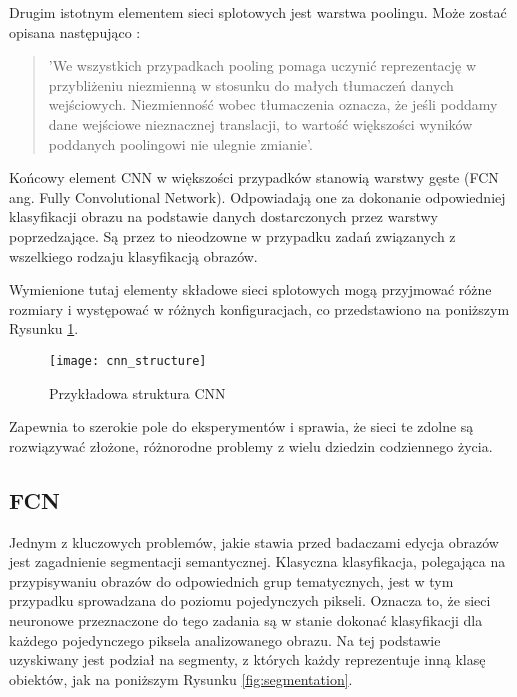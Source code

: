     Drugim istotnym elementem sieci splotowych jest warstwa poolingu. Może zostać opisana następująco \cite{pooling}:
    \begin{quote}
      'We wszystkich przypadkach pooling pomaga uczynić reprezentację w przybliżeniu niezmienną w stosunku do małych tłumaczeń danych wejściowych. Niezmienność wobec tłumaczenia oznacza, że jeśli poddamy dane wejściowe nieznacznej translacji, to wartość większości wyników poddanych poolingowi nie ulegnie zmianie'.
    \end{quote}

    Końcowy element CNN w większości przypadków stanowią warstwy gęste (FCN ang. Fully Convolutional Network). Odpowiadają one za dokonanie odpowiedniej klasyfikacji obrazu na podstawie danych dostarczonych przez warstwy poprzedzające. Są przez to nieodzowne w przypadku zadań związanych z wszelkiego rodzaju klasyfikacją obrazów.

    Wymienione tutaj elementy składowe sieci splotowych mogą przyjmować różne rozmiary i występować w różnych konfiguracjach, co przedstawiono na poniższym Rysunku \ref{fig:cnn_structure}.
    \begin{figure}[h]
     \centering
     \texttt{[image: cnn\_structure]}
     \caption[Przykładowa struktura CNN - źródło: \url{https://www.mathworks.com/solutions/deep-learning/convolutional-neural-network.html}]{Przykładowa struktura CNN}
     \label{fig:cnn_structure}
    \end{figure}
    \newline
    Zapewnia to szerokie pole do eksperymentów i sprawia, że sieci te zdolne są rozwiązywać złożone, różnorodne problemy z wielu dziedzin codziennego życia.

  \subsection{FCN}

   Jednym z kluczowych problemów, jakie stawia przed badaczami edycja obrazów jest zagadnienie segmentacji semantycznej. Klasyczna klasyfikacja, polegająca na przypisywaniu obrazów do odpowiednich grup tematycznych, jest w tym przypadku sprowadzana do poziomu pojedynczych pikseli. Oznacza to, że sieci neuronowe przeznaczone do tego zadania są w stanie dokonać klasyfikacji dla każdego pojedynczego piksela analizowanego obrazu. Na tej podstawie uzyskiwany jest podział na segmenty, z których każdy reprezentuje inną klasę obiektów, jak na poniższym Rysunku \ref{fig:segmentation}.

